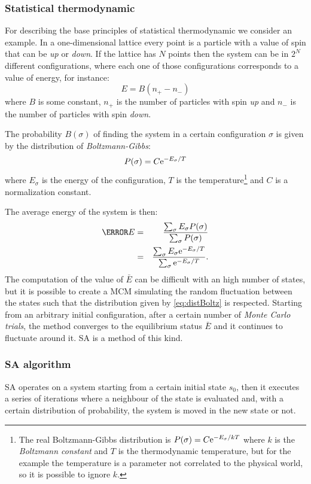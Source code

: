 \documentclass[dissertation.tex]{subfiles}
\begin{document}
\subsubsection{Statistical thermodynamic}
For describing the base principles of statistical thermodynamic we
consider an example. In a one-dimensional lattice every point
is a particle with a value of spin that can be \emph{up} or
\emph{down}. If the lattice has $N$ points then the system can be in
$2^N$ different configurations, where each one of those configurations
corresponds to a value of energy, for instance:
\begin{equation*}
  E=B(n_+-n_-)
\end{equation*}
where $B$ is some constant, $n_+$ is the number of particles with spin
\emph{up} and $n_-$ is the number of particles with spin \emph{down}.

The probability $B(\sigma)$ of finding the system in a certain
configuration $\sigma$ is given by the distribution of
\emph{Boltzmann-Gibbs}:
\begin{equation}\label{eq:distBoltz}
  P(\sigma) = C \mathrm{e}^{-E_\sigma/T}
\end{equation}
where $E_\sigma$ is the energy of the configuration, $T$ is the
temperature\footnote{The real Boltzmann-Gibbs distribution is
  $P(\sigma) = C \mathrm{e}^{-E_\sigma/kT}$ where $k$ is the \emph{Boltzmann
    constant} and $T$ is the thermodynamic temperature, but for the
  example the temperature is a parameter not correlated to the
  physical world, so it is possible to ignore $k$.} and $C$ is a
normalization constant.

The average energy of the system is then:
\begin{eqnarray*}
  \bar{E} &=& \frac{\sum_\sigma E_\sigma P(\sigma)}{\sum_\sigma
    P(\sigma)}\\
  &=& \frac{\sum_\sigma E_\sigma \me^{-E_\sigma/T}}{\sum_\sigma \me^{-E_\sigma/T}}.
\end{eqnarray*}
The computation of the value of $\bar{E}$ can be difficult with an
high number of 
states, but it is possible to create a \ac{MCM} simulating the random
fluctuation between the states such that the distribution given by
\cref{eq:distBoltz} is respected. Starting from an arbitrary initial
configuration, after a certain number of \emph{Monte Carlo trials},
the method converges to the equilibrium status $\bar{E}$ and it
continues
to fluctuate around it. \ac{SA} is a method of this kind.

\subsubsection{\acf{SA} algorithm}
\ac{SA} operates on a system starting from a certain initial state
$s_0$, then it executes a series of iterations where a
neighbour of the state is evaluated and, with a certain distribution
of probability, the system is moved in the new state or not.
\end{document}
